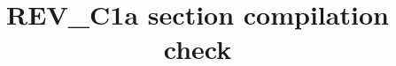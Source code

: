 \documentclass[11pt,reqno]{amsart}
\theoremstyle{plain}
\theoremstyle{definition}
\theoremstyle{remark}
\numberwithin{equation}{section}
\begin{document}
\title{REV\_C1a section compilation check}
\maketitle
\setcounter{section}{1}

\setcounter{section}{5}

\end{document}
